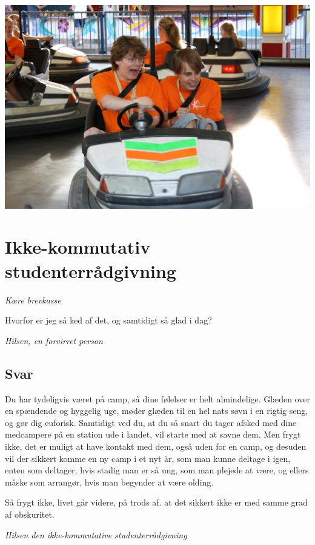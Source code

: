 \begin{minipage}[t]{120mm}
\vspace{3mm}

\includegraphics[width=\linewidth]{radiobil3.jpg}

\section*{Ikke-kommutativ studenterrådgivning}
\emph{Kære brevkasse}

Hvorfor er jeg så ked af det, og samtidigt så glad i dag?

\emph{Hilsen, en forvirret person}

\subsection*{Svar}

Du har tydeligvis været på camp, så dine følelser er helt almindelige. Glæden over en spændende og hyggelig uge, møder glæden til en hel nats søvn i en rigtig seng, og gør dig euforisk. Samtidigt ved du, at du så snart du tager afsked med dine medcampere på en station ude i landet, vil starte med at savne dem. Men frygt ikke, det er muligt at have kontakt med dem, også uden for en camp, og desuden vil der sikkert komme en ny camp i et nyt år, som man kunne deltage i igen, enten som deltager, hvis stadig man er så ung, som man plejede at være, og ellers måske som arrangør, hvis man begynder at være olding.

Så frygt ikke, livet går videre, på trods af. at det sikkert ikke er med samme grad af obskuritet.

{\flushright\emph{Hilsen den ikke-kommutative studenterrådgivning}}


\end{minipage}
